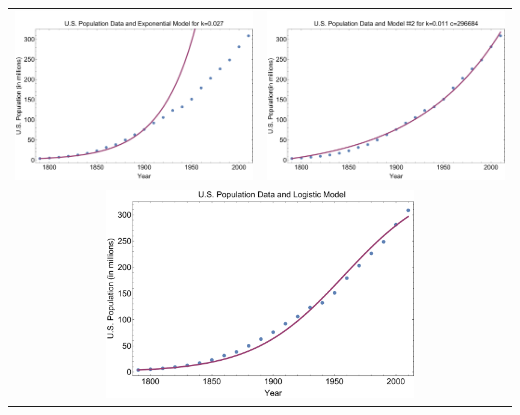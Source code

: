\documentclass[12pt]{article}
\begin{document}
\begin{enumerate}
\begin{center}
\begin{tabular}{cc}
\includegraphics[width=3.2in]{exponentialmodel.pdf}&
\includegraphics[width=3.2in]{immigrationmodel.pdf}\\
\multicolumn{2}{c}{\includegraphics[width=3.2in]{LogisticModel.pdf}}
\end{tabular}
\end{center}
\end{enumerate}
\end{document}
